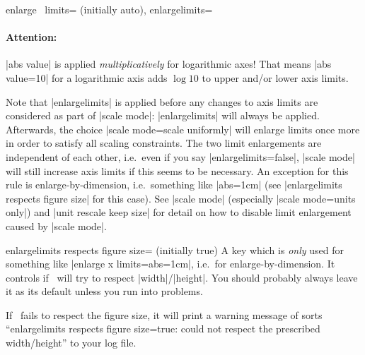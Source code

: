 \begin{pgfplotsxykeylist}{%
	enlarge \x\ limits= (initially auto),
	enlargelimits=}
	\paragraph{Attention:} |abs value| is applied \emph{multiplicatively} for logarithmic axes! That means |abs value=10| for a logarithmic axis adds $\log 10$ to upper and/or lower axis limits.
\begin{codeexample}[]
\end{codeexample}


	Note that |enlargelimits| is applied before any changes to axis limits are considered as part of |scale mode|: |enlargelimits| will always be applied. Afterwards, the choice |scale mode=scale uniformly| will enlarge limits once more in order to satisfy all scaling constraints. The two limit enlargements are independent of each other, i.e.\ even if you say |enlargelimits=false|, |scale mode| will still increase axis limits if this seems to be necessary. An exception for this rule is enlarge-by-dimension, i.e.\ something like |abs=1cm| (see |enlargelimits respects figure size| for this case).
	See |scale mode| (especially |scale mode=units only|) and |unit rescale keep size| for detail on how to disable limit enlargement caused by |scale mode|.
\end{pgfplotsxykeylist}

\begin{pgfplotskey}{enlargelimits respects figure size= (initially true)}
	A key which is \emph{only} used for something like |enlarge x limits={abs=1cm}|, i.e.\ for enlarge-by-dimension. It controls if \PGFPlots\ will try to respect |width|/|height|. You should probably always leave it as its default unless you run into problems.

	If \PGFPlots\ fails to respect the figure size, it will print a warning message of sorts ``enlargelimits respects figure size=true: could not respect the prescribed width/height'' to your log file.
	
\end{pgfplotskey}

